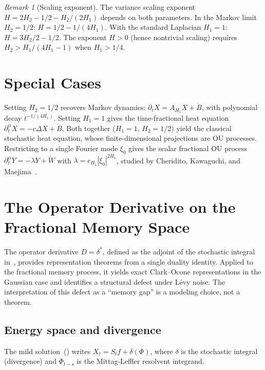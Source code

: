 \documentclass[11pt]{article}
\theoremstyle{definition}
\theoremstyle{remark}
\newtheorem{remark}[theorem]{Remark}
\begin{document}
\begin{remark}[Scaling exponent]
\label{rem:hurst}
The variance scaling exponent
$H = 2H_2 - 1/2 - H_2/(2H_1)$ depends on both
parameters.  In the Markov limit $H_2 = 1/2$:
$H = 1/2 - 1/(4H_1)$.  With the standard Laplacian
$H_1 = 1$: $H = 3H_2/2 - 1/2$.  The exponent
$H > 0$ (hence nontrivial scaling) requires
$H_2 > H_1/(4H_1 - 1)$ when $H_1 > 1/4$.
\end{remark}

\section{Special Cases}\label{sec:special}

Setting $H_2 = 1/2$ recovers Markov dynamics:
$\partial_t X = A_{H_1} X + \dot{B}$, with
polynomial decay $t^{-1/(4H_1)}$.
Setting $H_1 = 1$ gives the time-fractional heat
equation $\partial_t^\alpha X = -c\Delta X + \dot{B}$.
Both together ($H_1 = 1$, $H_2 = 1/2$) yield the
classical stochastic heat equation, whose
finite-dimensional projections are OU processes.
Restricting to a single Fourier mode $\xi_0$ gives
the scalar fractional OU process
$\partial_t^\alpha Y = -\lambda Y + \dot{W}$ with
$\lambda = c_{H_1}|\xi_0|^{2H_1}$,
studied by Cheridito, Kawaguchi, and
Maejima~\cite{cheridito2003}.

\section{The Operator Derivative on the Fractional Memory Space}
\label{sec:operator}

The operator derivative $D = \delta^*$, defined as the
adjoint of the stochastic integral
in~\cite{fontes2026opfac,fontes2026banach}, provides
representation theorems from a single duality identity.
Applied to the fractional memory process, it yields
exact Clark--Ocone representations in the Gaussian
case and identifies a structural defect under L\'evy
noise.  The interpretation of this defect as a
``memory gap'' is a modeling choice, not a theorem.

\subsection{Energy space and divergence}

The mild solution~() writes
$X_t = S_t f + \delta(\Phi)$, where $\delta$ is the
stochastic integral (divergence) and $\Phi_{t-s}$ is
the Mittag-Leffler resolvent integrand.
\end{document}

